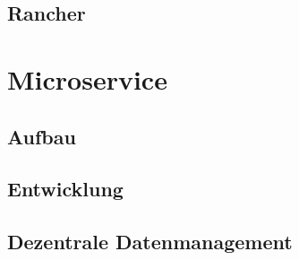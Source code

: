 \subsection{Rancher}

\section{Microservice}
\subsection{Aufbau}
\subsection{Entwicklung}
\subsection{Dezentrale Datenmanagement}


